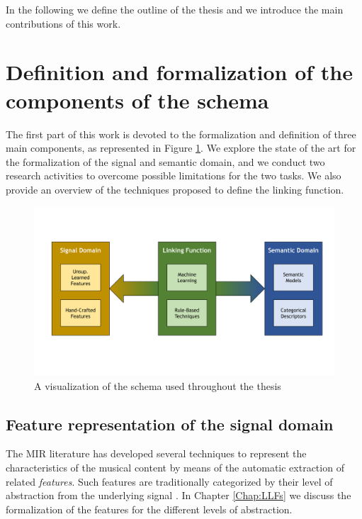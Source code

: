 In the following we define the outline of the thesis and we introduce the main contributions of this work.


\section{Definition and formalization of the components of the schema}
The first part of this work is devoted to the formalization and definition of three main components, as represented in Figure \ref{fig:intro:scheme}. We explore the state of the art for the formalization of the signal and semantic domain, and we conduct two research activities to overcome possible limitations for the two tasks. We also provide an overview of the techniques proposed to define the linking function.

\begin{figure}[tbp] 
	\begin{center}
		\includegraphics[trim=1.9cm 4.5cm 1.3cm 3.7cm,clip=true,width=\textwidth]{img/intro/schema_new_colorz}
	\end{center}
	\caption{A visualization of the schema used throughout the thesis}
	\label{fig:intro:scheme}
\end{figure}

\subsection{Feature representation of the signal domain}
The MIR literature has developed several techniques to represent the characteristics of the musical content by means of the automatic extraction of related \textit{features}. Such features are traditionally categorized by their level of abstraction from the underlying signal \cite{Celma2008}. In Chapter \ref{Chap:LLFs} we discuss the formalization of the features for the different levels of abstraction.

